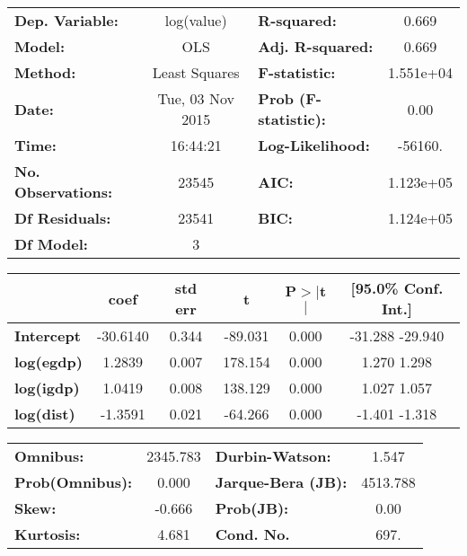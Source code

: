 \begin{center}
\begin{tabular}{lclc}
\toprule
\textbf{Dep. Variable:}    &    log(value)    & \textbf{  R-squared:         } &     0.669   \\
\textbf{Model:}            &       OLS        & \textbf{  Adj. R-squared:    } &     0.669   \\
\textbf{Method:}           &  Least Squares   & \textbf{  F-statistic:       } & 1.551e+04   \\
\textbf{Date:}             & Tue, 03 Nov 2015 & \textbf{  Prob (F-statistic):} &     0.00    \\
\textbf{Time:}             &     16:44:21     & \textbf{  Log-Likelihood:    } &   -56160.   \\
\textbf{No. Observations:} &       23545      & \textbf{  AIC:               } & 1.123e+05   \\
\textbf{Df Residuals:}     &       23541      & \textbf{  BIC:               } & 1.124e+05   \\
\textbf{Df Model:}         &           3      & \textbf{                     } &             \\
\bottomrule
\end{tabular}
\begin{tabular}{lccccc}
                   & \textbf{coef} & \textbf{std err} & \textbf{t} & \textbf{P$>$$|$t$|$} & \textbf{[95.0\% Conf. Int.]}  \\
\midrule
\textbf{Intercept} &     -30.6140  &        0.344     &   -89.031  &         0.000        &       -31.288   -29.940       \\
\textbf{log(egdp)} &       1.2839  &        0.007     &   178.154  &         0.000        &         1.270     1.298       \\
\textbf{log(igdp)} &       1.0419  &        0.008     &   138.129  &         0.000        &         1.027     1.057       \\
\textbf{log(dist)} &      -1.3591  &        0.021     &   -64.266  &         0.000        &        -1.401    -1.318       \\
\bottomrule
\end{tabular}
\begin{tabular}{lclc}
\textbf{Omnibus:}       & 2345.783 & \textbf{  Durbin-Watson:     } &    1.547  \\
\textbf{Prob(Omnibus):} &   0.000  & \textbf{  Jarque-Bera (JB):  } & 4513.788  \\
\textbf{Skew:}          &  -0.666  & \textbf{  Prob(JB):          } &     0.00  \\
\textbf{Kurtosis:}      &   4.681  & \textbf{  Cond. No.          } &     697.  \\
\bottomrule
\end{tabular}
\end{center}